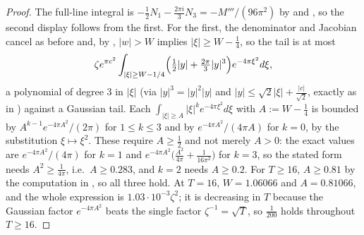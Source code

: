\begin{proof}
\leanok
{}
The full-line integral is $-\tfrac12N_{1}-\tfrac{2\pi i}3N_{3}=-M'''/(96\pi^{2})$ by
 and , so the second display follows from the first.  For
the first, the denominator and Jacobian cancel as before and, by ,
$\lvert w\rvert>W$ implies $\lvert\xi\rvert\ge W-\tfrac14$, so the tail is at most
\[
  \zeta e^{\pi c^{2}}\int_{\lvert\xi\rvert\ge W-1/4}
    \Bigl(\tfrac12\lvert y\rvert+\tfrac{2\pi}3\lvert y\rvert^{3}\Bigr)e^{-4\pi\xi^{2}}d\xi ,
\]
a polynomial of degree $3$ in $\lvert\xi\rvert$ (via $\lvert y\rvert^{3}=\lvert
y\rvert^{2}\lvert y\rvert$ and $\lvert y\rvert\le\sqrt2\lvert\xi\rvert+\tfrac{\lvert
c\rvert}{\sqrt2}$, exactly as in ) against a Gaussian tail.  Each
$\int_{\lvert\xi\rvert\ge A}\lvert\xi\rvert^{k}e^{-4\pi\xi^{2}}d\xi$ with $A:=W-\tfrac14$ is
bounded by $A^{k-1}e^{-4\pi A^{2}}/(2\pi)$ for $1\le k\le3$ and by $e^{-4\pi A^{2}}/(4\pi A)$ for
$k=0$, by the substitution $\xi\mapsto\xi^{2}$.  These require $A\ge\tfrac12$ and not merely
$A>0$: the exact values are $e^{-4\pi A^{2}}/(4\pi)$ for $k=1$ and $e^{-4\pi A^{2}}\bigl(\tfrac{
A^{2}}{4\pi}+\tfrac1{16\pi^{2}}\bigr)$ for $k=3$, so the stated form needs
$A^{2}\ge\tfrac1{4\pi}$, i.e.\ $A\ge0.283$, and $k=2$ needs $A\ge0.2$.  For $T\ge16$,
$A\ge0.81$ by the computation in , so all three hold.
At $T=16$, $W=1.06066$ and
$A=0.81066$, and the whole expression is $1.03\cdot10^{-3}\zeta^{2}$; it is decreasing in $T$
because the Gaussian factor $e^{-4\pi A^{2}}$ beats the single factor $\zeta^{-1}=\sqrt T$, so
$\tfrac1{200}$ holds throughout $T\ge16$.


\end{proof}
